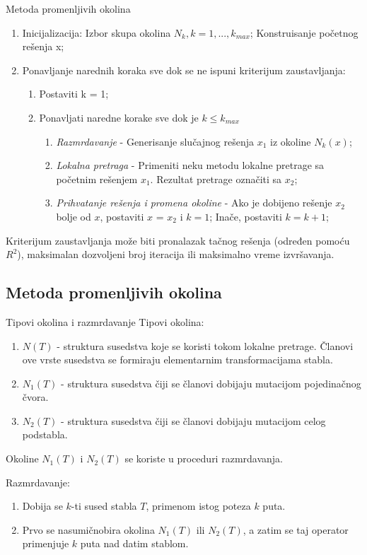 \documentclass{beamer}
\begin{document}
\begin{frame}{Metoda promenljivih okolina}
\begin{enumerate}
  \item Inicijalizacija: Izbor skupa okolina $N_k, k = 1, ..., k_{max}$; Konstruisanje početnog rešenja x;
  \item Ponavljanje narednih koraka sve dok se ne ispuni kriterijum zaustavljanja:
  \begin{enumerate}
    \item Postaviti k = 1;
    \item Ponavljati naredne korake sve dok je $k \leq k_{max}$
        \begin{enumerate}
        \item \textit{Razmrdavanje} - Generisanje slučajnog rešenja $x_1$ iz okoline $N_k(x)$;
        \item \textit{Lokalna pretraga} - Primeniti neku metodu lokalne pretrage sa početnim rešenjem $x_1$. Rezultat pretrage označiti sa $x_2$;
        \item \textit{Prihvatanje rešenja i promena okoline} - Ako je dobijeno rešenje $x_2$ bolje od  $x$, postaviti $x$ = $x_2$ i  $k = 1$; Inače, postaviti $k = k + 1$;
      \end{enumerate}
  \end{enumerate}
\end{enumerate}
Kriterijum zaustavljanja može biti pronalazak tačnog rešenja (određen pomoću $R^2$), maksimalan dozvoljeni broj iteracija ili maksimalno vreme izvršavanja.
\end{frame}

\subsection{Metoda promenljivih okolina}
\begin{frame}{Tipovi okolina i razmrdavanje}
Tipovi okolina:
\begin{enumerate}
    \item  $N(T)$ - struktura susedstva koje se koristi tokom lokalne pretrage. Članovi ove vrste susedstva se formiraju elementarnim transformacijama stabla.
    \item $N_1(T)$ - struktura susedstva čiji se članovi dobijaju mutacijom pojedinačnog čvora.
    \item $N_2(T)$ - struktura susedstva čiji se članovi dobijaju mutacijom celog podstabla.
\end{enumerate}
Okoline $N_1(T)$ i $N_2(T)$ se koriste u proceduri razmrdavanja.

Razmrdavanje:
\begin{enumerate}
    \item Dobija se $k$-ti sused stabla $T$, primenom istog poteza $k$ puta.
    \item Prvo se nasumičnobira okolina $N_1(T)$ ili $N_2(T)$, a zatim se taj operator primenjuje $k$ puta nad datim stablom.
\end{enumerate}
\end{frame}
\end{document}
